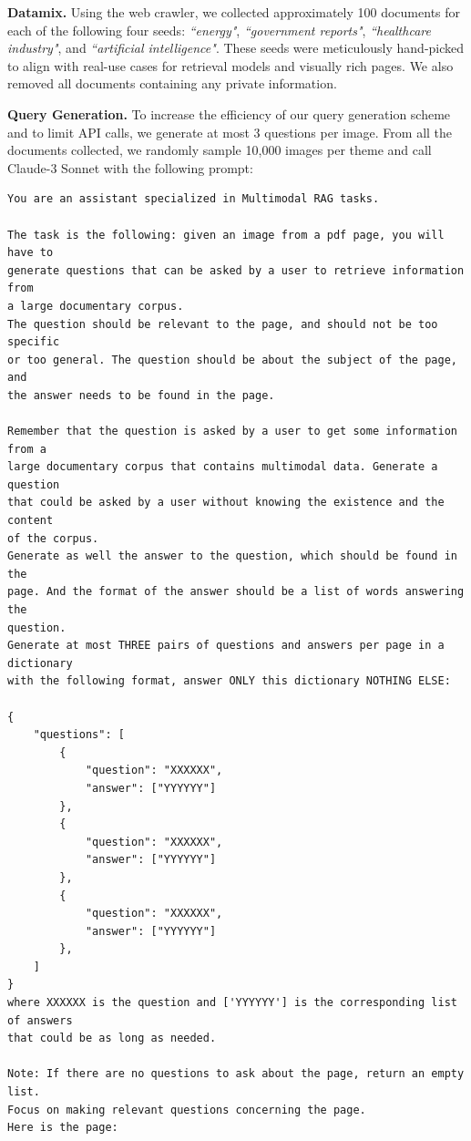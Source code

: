 \documentclass{article} %
\begin{document}
\noindent\textbf{Datamix.} Using the web crawler, we collected approximately 100 documents for each of the following four seeds: \textit{``energy"}, \textit{``government reports"}, \textit{``healthcare industry"}, and \textit{``artificial intelligence"}. These seeds were meticulously hand-picked to align with real-use cases for retrieval models and visually rich pages. We also removed all documents containing any private information. 

\noindent\textbf{Query Generation.}\label{paragraph:query_generation} To increase the efficiency of our query generation scheme and to limit API calls, we generate at most 3 questions per image. From all the documents collected, we randomly sample 10,000 images per theme and call Claude-3 Sonnet with the following prompt:


\begin{tcolorbox}
\small
\begin{Verbatim}[breaklines=true]
You are an assistant specialized in Multimodal RAG tasks.

The task is the following: given an image from a pdf page, you will have to 
generate questions that can be asked by a user to retrieve information from 
a large documentary corpus. 
The question should be relevant to the page, and should not be too specific 
or too general. The question should be about the subject of the page, and 
the answer needs to be found in the page.

Remember that the question is asked by a user to get some information from a
large documentary corpus that contains multimodal data. Generate a question 
that could be asked by a user without knowing the existence and the content 
of the corpus.
Generate as well the answer to the question, which should be found in the
page. And the format of the answer should be a list of words answering the
question.
Generate at most THREE pairs of questions and answers per page in a dictionary
with the following format, answer ONLY this dictionary NOTHING ELSE:

{
    "questions": [
        {
            "question": "XXXXXX",
            "answer": ["YYYYYY"]
        },
        {
            "question": "XXXXXX",
            "answer": ["YYYYYY"]
        },
        {
            "question": "XXXXXX",
            "answer": ["YYYYYY"]
        },
    ]
}
where XXXXXX is the question and ['YYYYYY'] is the corresponding list of answers
that could be as long as needed.

Note: If there are no questions to ask about the page, return an empty list.
Focus on making relevant questions concerning the page.
Here is the page:

\end{Verbatim}
\end{tcolorbox}
\end{document}
